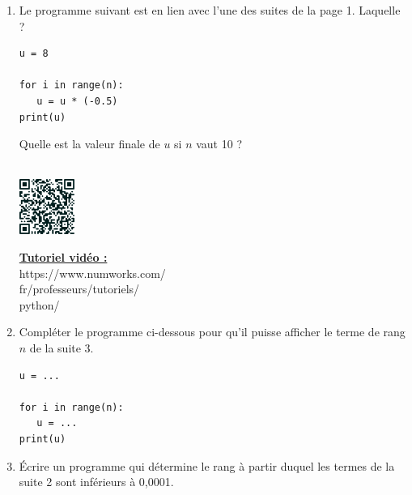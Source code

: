 \documentclass[a4paper,11pt,exos]{nsi} %
\begin{document}
\setlength{\columnseprule}{0.5pt}
\setlength{\columnsep}{1cm}
\exo{}
\begin{multicols}{2}
	\begin{enumerate}
		\item 	 Le programme suivant est en lien avec l'une des suites de la page 1. Laquelle ?\\[.7em]
        \begin{pyc}
            \begin{verbatim}
u = 8

for i in range(n):
   u = u * (-0.5)
print(u)
            \end{verbatim}
        \end{pyc}

		Quelle est la valeur finale de $u$ si $n$ vaut 10 ?\\[.7em]
		\\[1em]
		\begin{minipage}{2cm}
			\includegraphics[width=1.8cm]{qr_code_python}
		\end{minipage}
		\begin{minipage}{5.5cm}
			\href{https://www.numworks.com/fr/professeurs/tutoriels/python/}{\textbf{Tutoriel vidéo :}}\\
			https://www.numworks.com/ \\
			fr/professeurs/tutoriels/ \\
			python/ \\
		\end{minipage}
		
		
		\item	Compléter le programme ci-dessous pour qu'il puisse afficher le terme de rang $n$ de la suite 3.
		\begin{pyc}
            \begin{verbatim}
u = ...

for i in range(n):
   u = ...
print(u)
            \end{verbatim}
        \end{pyc}

		\item 	\'Ecrire un programme qui détermine le rang à partir duquel les termes de la suite 2 sont inférieurs à 0,0001.\\[.5em]
	\end{enumerate}
\end{multicols}
\end{document}
